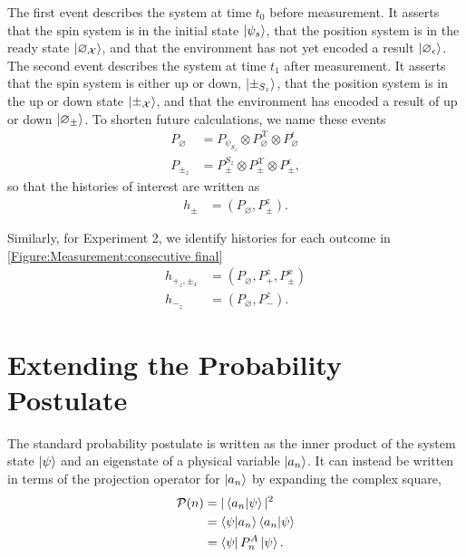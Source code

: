 The first event describes the system at time $t_0$ before measurement. It asserts that the spin system is in the initial state $\ket{\psi_s}$, that the position system is in the ready state ${\ket{\varnothing_\mathcal{X}}}$, and that the environment has not yet encoded a result $\ket{\varnothing_\epsilon}$. The second event describes the system at time $t_1$ after measurement. It asserts that the spin system is either up or down, $\ket{\pm_{S_z}}$, that the position system is in the up or down state ${\ket{\pm_\mathcal{X}}}$, and that the environment has encoded a result of up or down $\ket{\varnothing_\pm}$.  To shorten future calculations, we name these events
\begin{align}
  P_\varnothing &= P_{\psi_{S_z}} \otimes P^\mathcal{X}_\varnothing \otimes P^\epsilon_\varnothing  \\ \nonumber
  P_{\pm_z} &= P^{S_z}_\pm \otimes P^\mathcal{X}_\pm \otimes P^\epsilon_\pm,
\end{align}
so that the histories of interest are written as
\begin{align}
  h_\pm &= \left(P_\varnothing, P^z_{\pm} \right).
\end{align}

Similarly, for Experiment 2, we identify histories for each outcome in \autoref{Figure:Measurement:consecutive final}
\begin{align} \label{eq:Experiment 2 Histories}
  h_{+_z, \pm_x} &= \left(P_\varnothing, P^z_+, P^x_\pm \right) \\ \nonumber
  h_{-_z} &= \left(P_\varnothing, P^z_-\right).
\end{align}

\section{Extending the Probability Postulate}

The standard probability postulate is written as the inner product of the system state $\ket{\psi}$ and an eigenstate of a physical variable $\ket{a_n}$. It can instead be written in terms of the projection operator for $\ket{a_n}$ by expanding the complex square,
\begin{align}
        \mathcal{P}(n) &= |\braket{a_n|\psi}|^2 \\ \nonumber
        &= \braket{\psi|a_n} \braket{a_n|\psi} \\ \nonumber
        &= \bra{\psi} P^A_n \ket{\psi}.
\end{align}

